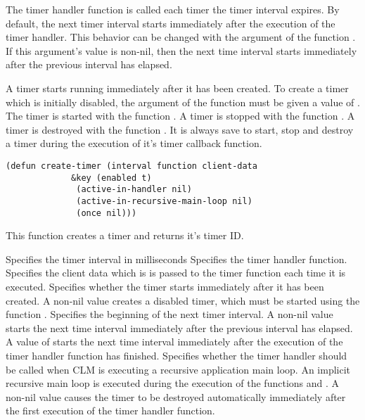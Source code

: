 The timer handler function is called each timer the timer interval expires.  By
default, the next timer interval starts immediately after the execution of the
timer handler.  This behavior can be changed with the 
argument of the function .  If this argument's value is
non-nil, then the next time interval starts immediately after the previous
interval has elapsed. 

A timer starts running immediately after it has been created.  To create a timer
which is initially disabled, the  argument of the function
 must be given a value of .  The timer is started
with the function .  A timer is stopped with the function
.  A timer is destroyed with the function .
It is always save to start, stop and destroy a timer during the execution of
it's timer callback function. 

\begin{lispd}
\syntax\begin{verbatim}
(defun create-timer (interval function client-data
		     &key (enabled t)
			  (active-in-handler nil)
			  (active-in-recursive-main-loop nil)
			  (once nil)))
\end{verbatim}
\beschr This function creates a timer and returns it's timer ID.
\parameter
\begin{paramd}
 Specifies the timer interval in milliseconds
 Specifies the timer handler function.
 Specifies the client data which is is passed to the timer
function each time it is executed.
 Specifies whether the timer starts immediately after it has 
been created. A non-nil value creates a disabled timer, which must be started
using the function .
 Specifies the beginning of the next timer interval.
A non-nil value starts the next time interval immediately after the previous 
interval has elapsed. A value of  starts the next time interval
immediately after the execution of the timer handler function has finished.
 Specifies whether the timer handler
should be called when CLM is executing a recursive application main loop. An
implicit recursive main loop is executed during the execution of the functions
 and .
 A non-nil value causes the timer to be destroyed automatically
immediately after the first execution of the timer handler function.
\end{paramd}
\end{lispd}

